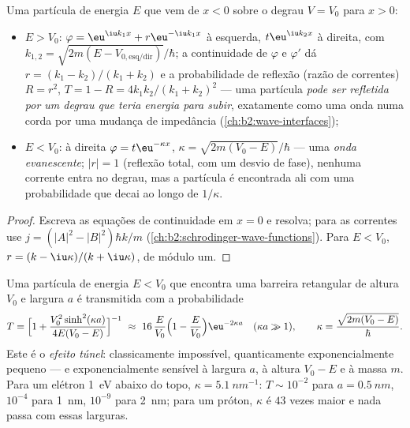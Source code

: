 \begin{proposition}\label{prop:b2:potential-wells-tunneling:step}
Uma partícula de energia $E$ que vem de $x < 0$ sobre o degrau $V = V_0$
para $x > 0$:
\begin{itemize}
\item $E > V_0$: $\varphi = \eu^{\iu k_1x} + r\eu^{-\iu k_1x}$ à esquerda, $t\eu^{\iu
      k_2x}$ à direita, com $k_{1,2} = \sqrt{2m(E - V_{0,\text{esq/dir}})}/
      \hbar$; a continuidade de $\varphi$ e $\varphi'$ dá $r = (k_1 - k_2)/(k_1
      + k_2)$ e a probabilidade de reflexão (razão de correntes) $R = r^2$,
      $T = 1 - R = 4k_1k_2/(k_1 + k_2)^2$ --- uma partícula \emph{pode ser
      refletida por um degrau que teria energia para subir}, exatamente como uma onda numa
      corda por uma mudança de impedância (\cref{ch:b2:wave-interfaces});
\item $E < V_0$: à direita $\varphi = t\eu^{-\kappa x}$, $\kappa = \sqrt{2m(V_0
      - E)}/\hbar$ --- uma \emph{onda evanescente}; $|r| = 1$ (reflexão total, com um desvio de fase), nenhuma
      corrente entra no degrau, mas a partícula é encontrada ali com uma
      probabilidade que decai ao longo de $1/\kappa$.
\end{itemize}
\end{proposition}

\begin{proof}
Escreva as equações de continuidade em $x = 0$ e resolva; para as correntes
use $j = (|A|^2 - |B|^2)\hbar k/m$ (\cref{ch:b2:schrodinger-wave-functions}).
Para $E < V_0$, $r = (k - \iu\kappa)/(k + \iu\kappa)$, de módulo um.
\end{proof}

\begin{theorem}\label{thm:b2:potential-wells-tunneling:tunnel}
Uma partícula de energia $E < V_0$ que encontra uma barreira retangular de altura
$V_0$ e largura $a$ é transmitida com a probabilidade
\[
T = \Big[1 + \frac{V_0^2\sinh^2(\kappa a)}{4E(V_0 - E)}\Big]^{-1}
\ \approx\ 16\,\frac{E}{V_0}\Big(1 - \frac{E}{V_0}\Big)\eu^{-2\kappa a}
\quad (\kappa a \gg 1), \qquad
\kappa = \frac{\sqrt{2m(V_0 - E)}}{\hbar} .
\]
Este é o \emph{efeito túnel}: classicamente
impossível, quanticamente exponencialmente pequeno --- e
exponencialmente sensível à largura $a$, à altura $V_0 - E$ e à
massa $m$. Para um elétron \qty{1}{eV} abaixo do topo, $\kappa = \qty{5.1}{nm^{-1}}$:
$T \sim 10^{-2}$ para $a = \qty{0.5}{nm}$, $10^{-4}$ para \qty{1}{nm}, $10^{-9}$ para
\qty{2}{nm}; para um próton, $\kappa$ é $43$ vezes maior e nada passa
com essas larguras.
\end{theorem}

